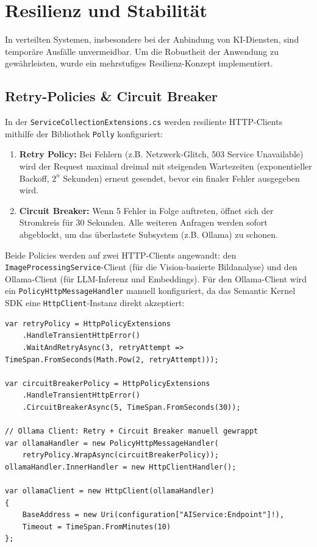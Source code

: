 \section{Resilienz und Stabilit\"at}
In verteilten Systemen, insbesondere bei der Anbindung von KI-Diensten, sind tempor\"are Ausf\"alle unvermeidbar. Um die Robustheit der Anwendung zu gew\"ahrleisten, wurde ein mehrstufiges Resilienz-Konzept implementiert.

\subsection{Retry-Policies \& Circuit Breaker}
In der \texttt{ServiceCollectionExtensions.cs} werden resiliente HTTP-Clients mithilfe der Bibliothek \texttt{Polly} \cite{polly} konfiguriert:
\begin{enumerate}
    \item \textbf{Retry Policy:} Bei Fehlern (z.B. Netzwerk-Glitch, 503 Service Unavailable) wird der Request maximal dreimal mit steigenden Wartezeiten (exponentieller Backoff, $2^n$ Sekunden) erneut gesendet, bevor ein finaler Fehler ausgegeben wird.
    \item \textbf{Circuit Breaker:} Wenn 5 Fehler in Folge auftreten, \glqq{}\"offnet\grqq{} sich der Stromkreis f\"ur 30 Sekunden. Alle weiteren Anfragen werden sofort abgeblockt, um das \"uberlastete Subsystem (z.B. Ollama) zu schonen.
\end{enumerate}

\newpage
Beide Policies werden auf zwei HTTP-Clients angewandt: den \texttt{ImageProcessingService}-Client (f\"ur die Vision-basierte Bildanalyse) und den Ollama-Client (f\"ur LLM-Inferenz und Embeddings). F\"ur den Ollama-Client wird ein \texttt{PolicyHttpMessageHandler} manuell konfiguriert, da das Semantic Kernel SDK eine \texttt{HttpClient}-Instanz direkt akzeptiert:

\begin{lstlisting}[language={[Sharp]C}, caption={Polly-Konfiguration und HTTP-Client-Setup}]
var retryPolicy = HttpPolicyExtensions
    .HandleTransientHttpError()
    .WaitAndRetryAsync(3, retryAttempt => TimeSpan.FromSeconds(Math.Pow(2, retryAttempt)));

var circuitBreakerPolicy = HttpPolicyExtensions
    .HandleTransientHttpError()
    .CircuitBreakerAsync(5, TimeSpan.FromSeconds(30));

// Ollama Client: Retry + Circuit Breaker manuell gewrappt
var ollamaHandler = new PolicyHttpMessageHandler(
    retryPolicy.WrapAsync(circuitBreakerPolicy));
ollamaHandler.InnerHandler = new HttpClientHandler();

var ollamaClient = new HttpClient(ollamaHandler)
{
    BaseAddress = new Uri(configuration["AIService:Endpoint"]!),
    Timeout = TimeSpan.FromMinutes(10)
};
\end{lstlisting}

